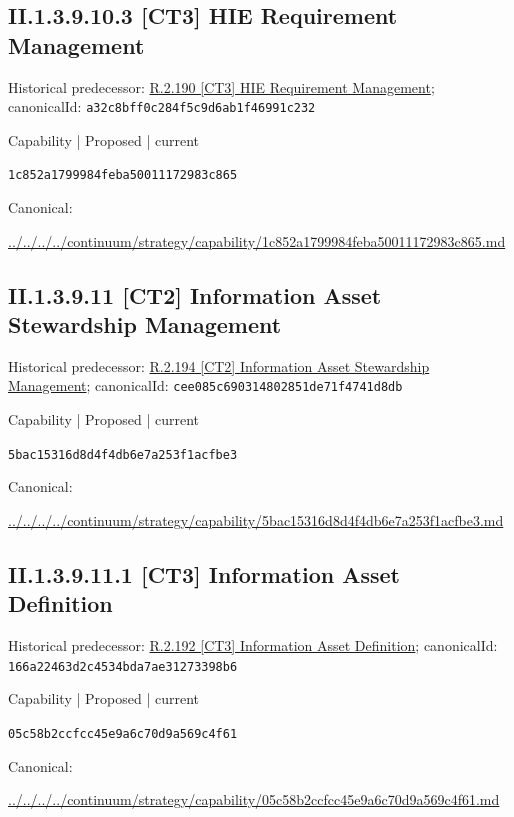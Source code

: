 \documentclass[10pt,a4paper]{article}
\begin{document}
\subsection*{II.1.3.9.10.3 [CT3] HIE Requirement Management}
Historical predecessor: \hyperref[element-a32c8bff0c284f5c9d6ab1f46991c232]{R.2.190 [CT3] HIE Requirement Management}; canonicalId: \texttt{a32c8bff0c284f5c9d6ab1f46991c232}\par
\label{element-1c852a1799984feba50011172983c865}
{\small Capability | Proposed | current}\par
\texttt{1c852a1799984feba50011172983c865}\par
Canonical: \par
{\footnotesize\url{../../../../continuum/strategy/capability/1c852a1799984feba50011172983c865.md}}\par
\subsection*{II.1.3.9.11 [CT2] Information Asset Stewardship Management}
Historical predecessor: \hyperref[element-cee085c690314802851de71f4741d8db]{R.2.194 [CT2] Information Asset Stewardship Management}; canonicalId: \texttt{cee085c690314802851de71f4741d8db}\par
\label{element-5bac15316d8d4f4db6e7a253f1acfbe3}
{\small Capability | Proposed | current}\par
\texttt{5bac15316d8d4f4db6e7a253f1acfbe3}\par
Canonical: \par
{\footnotesize\url{../../../../continuum/strategy/capability/5bac15316d8d4f4db6e7a253f1acfbe3.md}}\par
\subsection*{II.1.3.9.11.1 [CT3] Information Asset Definition}
Historical predecessor: \hyperref[element-166a22463d2c4534bda7ae31273398b6]{R.2.192 [CT3] Information Asset Definition}; canonicalId: \texttt{166a22463d2c4534bda7ae31273398b6}\par
\label{element-05c58b2ccfcc45e9a6c70d9a569c4f61}
{\small Capability | Proposed | current}\par
\texttt{05c58b2ccfcc45e9a6c70d9a569c4f61}\par
Canonical: \par
{\footnotesize\url{../../../../continuum/strategy/capability/05c58b2ccfcc45e9a6c70d9a569c4f61.md}}\par
\end{document}
